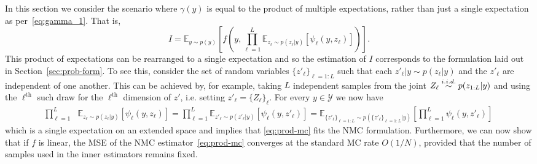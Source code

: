 In this section we consider the scenario  where $\gamma (y)$ is equal to the product of 
multiple expectations, rather than just a single expectation as per~\eqref{eq:gamma_1}.
That is,
\begin{equation}
\label{eq:prod-mc}
I = \mathbb{E}_{y\sim p(y)}\left[ f\left(y,\prod_{\ell=1}^{L}\mathbb{E}_{z_{\ell}\sim p(z_{\ell}|y)}\left[\psi_{\ell}(y,z_{\ell})\right]\right) \right].
\end{equation}
This product of expectations can be rearranged to a single expectation and so the estimation of $I$ 
corresponds to the formulation laid out in Section~\ref{sec:prob-form}. To see this, consider the set of 
random variables $\{z'_{\ell}\}_{\ell=1:L}$ such that each 
$z'_{\ell}|y \sim p(z_\ell | y)$ and the $z'_{\ell}$ are independent of one another. 
This can be achieved by, for example, taking $L$ independent samples from the joint $Z_{\ell} \overset{i.i.d.}{\sim} p(z_{1:L} | y)$ 
and using the $\ell^{\mathrm{th}}$ such draw for the $\ell^{\mathrm{th}}$ dimension of $z'$, i.e.
setting $z'_{\ell}= \{Z_{\ell}\}_{\ell}$.
For every $y \in \mathcal{Y}$ we now have
\begin{align*}
 \prod_{\ell=1}^{L}&\mathbb{E}_{z_{\ell}\sim p(z_{\ell}|y)}[\psi_{\ell}(y,z_{\ell})] =  \prod_{\ell=1}^{L}\mathbb{E}_{z'_{\ell}\sim p(z'_{\ell}|y)}[\psi_{\ell}(y,z'_{\ell})]
  = \mathbb{E}_{\{z'_{\ell}\}_{\ell=1:L} \sim p(\{z'_{\ell}\}_{\ell=1:L}|y)}\left[ \prod_{\ell=1}^{L} \psi_{\ell}(y,z'_{\ell}) \right]
\end{align*}
which is a single expectation on an extended space and implies that \eqref{eq:prod-mc} 
fits the NMC formulation.
Furthermore, we can now show that if $f$ is linear, the MSE of the NMC estimator~\eqref{eq:prod-mc}
converges at the standard MC rate $O(1/N)$, provided that 
the number of samples used in the inner estimators remains fixed.  

